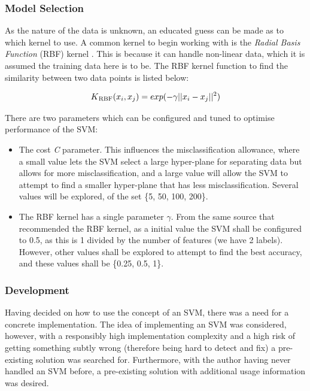 \subsubsection*{Model Selection}
As the nature of the data is unknown, an educated guess can be made as to which kernel to use. A common kernel to begin working with is the \textit{Radial Basis Function} (RBF) kernel \cite{Chih-WeiHsuChih-ChungChang2008}. This is because it can handle non-linear data, which it is assumed the training data here is to be. The RBF kernel function to find the similarity between two data points is listed below:

\begin{equation*}
K\textsubscript{RBF}(x_i, x_j) = exp(-\gamma||x_i - x_j||^2)
\end{equation*}

\noindent There are two parameters which can be configured and tuned to optimise performance of the SVM:
\begin{itemize}
	\item The cost \textit{C} parameter. This influences the misclassification allowance, where a small value lets the SVM select a large hyper-plane for separating data but allows for more misclassification, and a large value will allow the SVM to attempt to find a smaller hyper-plane that has less misclassification. Several values will be explored, of the set \{5, 50, 100, 200\}.
	\item The RBF kernel has a single parameter $\gamma$. From the same source that recommended the RBF kernel, as a initial value the SVM shall be configured to 0.5, as this is 1 divided by the number of features (we have 2 labels). However, other values shall be explored to attempt to find the best accuracy, and these values shall be \{0.25, 0.5, 1\}.
\end{itemize}

\subsubsection*{Development}
Having decided on how to use the concept of an SVM, there was a need for a concrete implementation. The idea of implementing an SVM was considered, however, with a responsibly high implementation complexity and a high risk of getting something subtly wrong (therefore being hard to detect and fix) a pre-existing solution was searched for. Furthermore, with the author having never handled an SVM before, a pre-existing solution with additional usage information was desired.

